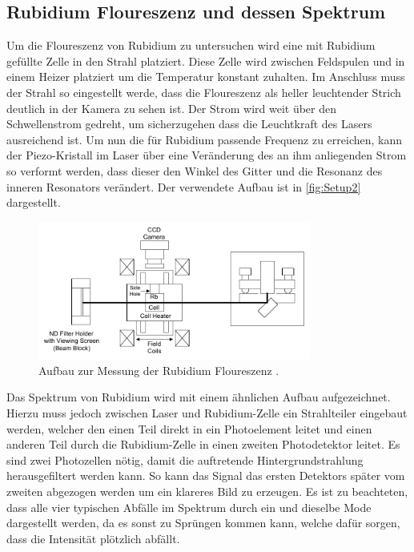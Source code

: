 \subsection{Rubidium Floureszenz und dessen Spektrum}
\label{sec:Rubi}
Um die Floureszenz von Rubidium zu untersuchen wird eine mit Rubidium gefüllte Zelle in den Strahl platziert. Diese Zelle wird zwischen Feldspulen und in einem Heizer platziert um die Temperatur konstant zuhalten.
Im Anschluss muss der Strahl so eingestellt werde, dass die Floureszenz als heller leuchtender Strich deutlich in der Kamera zu sehen ist. Der Strom wird weit über den Schwellenstrom gedreht, um sicherzugehen dass die Leuchtkraft des Lasers
ausreichend ist. Um nun die für Rubidium passende Frequenz zu erreichen, kann der Piezo-Kristall im Laser über eine Veränderung des an ihm anliegenden Strom so verformt werden, dass dieser 
den Winkel des Gitter und die Resonanz des inneren Resonators verändert.
Der verwendete Aufbau ist in \autoref{fig:Setup2} dargestellt.
\begin{figure}
    \centering
        \includegraphics[width=0.8\textwidth]{Setup2.pdf}
        \caption{Aufbau zur Messung der Rubidium Floureszenz \cite{ap60}.}
        \label{fig:Setup2} 
\end{figure}
Das Spektrum von Rubidium wird mit einem ähnlichen Aufbau aufgezeichnet. Hierzu muss jedoch zwischen Laser und Rubidium-Zelle ein Strahlteiler eingebaut werden, welcher den einen Teil direkt in ein Photoelement leitet
und einen anderen Teil durch die Rubidium-Zelle in einen zweiten Photodetektor leitet.
Es sind zwei Photozellen nötig, damit die auftretende Hintergrundstrahlung herausgefiltert werden kann. So kann das Signal das ersten Detektors später vom zweiten abgezogen werden um ein klareres Bild zu erzeugen.
Es ist zu beachteten, dass alle vier typischen Abfälle im Spektrum durch ein und dieselbe Mode dargestellt werden, da es sonst zu Sprüngen kommen kann, welche dafür sorgen, dass die Intensität plötzlich abfällt.